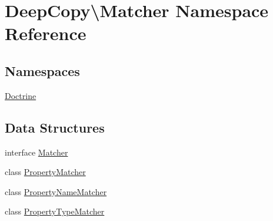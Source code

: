 \hypertarget{namespace_deep_copy_1_1_matcher}{}\section{Deep\+Copy\textbackslash{}Matcher Namespace Reference}
\label{namespace_deep_copy_1_1_matcher}
\subsection*{Namespaces}
\begin{DoxyCompactItemize}
\item 
 \mbox{\hyperlink{namespace_deep_copy_1_1_matcher_1_1_doctrine}{Doctrine}}
\end{DoxyCompactItemize}
\subsection*{Data Structures}
\begin{DoxyCompactItemize}
\item 
interface \mbox{\hyperlink{interface_deep_copy_1_1_matcher_1_1_matcher}{Matcher}}
\item 
class \mbox{\hyperlink{class_deep_copy_1_1_matcher_1_1_property_matcher}{Property\+Matcher}}
\item 
class \mbox{\hyperlink{class_deep_copy_1_1_matcher_1_1_property_name_matcher}{Property\+Name\+Matcher}}
\item 
class \mbox{\hyperlink{class_deep_copy_1_1_matcher_1_1_property_type_matcher}{Property\+Type\+Matcher}}
\end{DoxyCompactItemize}
